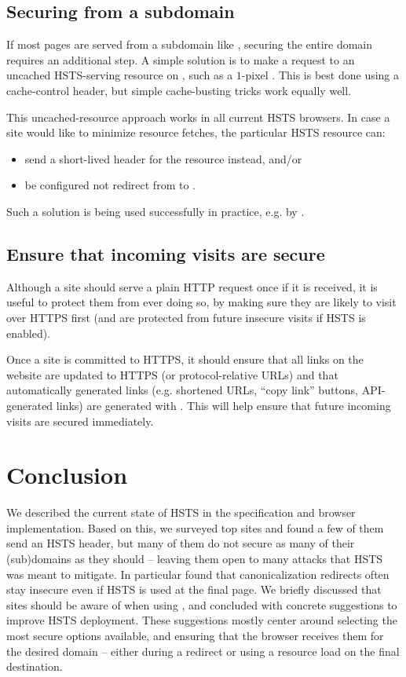 \documentclass{acm_proc_article-sp}
\begin{document}
{\subsection{Securing {\s} from a subdomain}

If most pages are served from a subdomain like {\sw}, securing the entire domain requires an additional step. A simple solution is to make a request to an uncached HSTS-serving resource on {\s}, such as a $1$-pixel . This is best done using a cache-control header, but simple cache-busting tricks work equally well.

This uncached-resource approach works in all current HSTS browsers. In case a site would like to minimize resource fetches, the particular HSTS resource can:
\begin{itemize}
\item send a short-lived  header for the resource instead, and/or
\item be configured not redirect from {\s} to {\sw}.
\end{itemize}

Such a solution is being used successfully in practice, e.g. by .

\subsection{Ensure that incoming visits are secure}

Although a site should serve a plain HTTP request once if it is received, it is useful to protect them from ever doing so, by making sure they are likely to visit over HTTPS first (and are protected from future insecure visits if HSTS is enabled).

Once a site is committed to HTTPS, it should ensure that all links on the website are updated to HTTPS (or protocol-relative URLs) and that automatically generated links (e.g. shortened URLs, ``copy link'' buttons, API-generated links) are generated with . This will help ensure that future incoming visits are secured immediately.


\section{Conclusion}

We described the current state of HSTS in the specification and browser implementation. Based on this, we surveyed top sites and found a few of them send an HSTS header, but many of them do not secure as many of their (sub)domains as they should -- leaving them open to many attacks that HSTS was meant to mitigate. In particular found that canonicalization redirects often stay insecure even if HSTS is used at the final page. We briefly discussed that sites should be aware of when using {\iSD}, and concluded with concrete suggestions to improve HSTS deployment. These suggestions mostly center around selecting the most secure options available, and ensuring that the browser receives them for the desired domain -- either during a redirect or using a resource load on the final destination.

}
\end{document}
